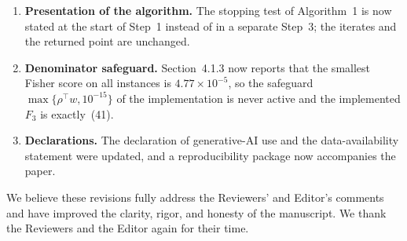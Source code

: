 \documentclass[11pt]{article}
\begin{document}
\begin{enumerate}[leftmargin=1.6em,itemsep=3pt]
  outperform DTAP.
\item \textbf{Presentation of the algorithm.} The stopping test of Algorithm~1 is now
  stated at the start of Step~1 instead of in a separate Step~3; the iterates and the
  returned point are unchanged.
\item \textbf{Denominator safeguard.} Section~4.1.3 now reports that the smallest Fisher
  score on all instances is $4.77\times10^{-5}$, so the safeguard $\max\{\rho^{\top}w,10^{-15}\}$
  of the implementation is never active and the implemented $F_3$ is exactly~(41).
\item \textbf{Declarations.} The declaration of generative-AI use and the data-availability
  statement were updated, and a reproducibility package now accompanies the paper.
\end{enumerate}

\bigskip
\noindent We believe these revisions fully address the Reviewers' and Editor's comments
and have improved the clarity, rigor, and honesty of the manuscript. We thank the
Reviewers and the Editor again for their time.
\end{document}
